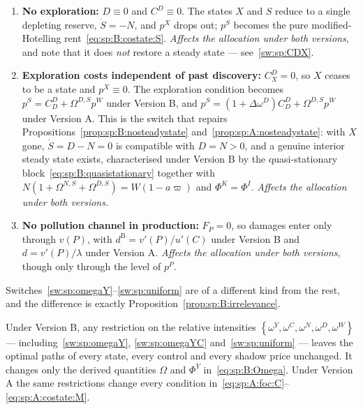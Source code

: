 \begin{enumerate}[label=\textbf{(W\arabic*)},ref=W\arabic*,leftmargin=3.2em,itemsep=0.35em]
\item\label{sw:sp:explore} \textbf{No exploration:} $D\equiv0$ and $C^D\equiv0$. The states $X$ and $S$
reduce to a single depleting reserve, $\dot S=-N$, and $p^X$ drops out; $p^S$ becomes the pure
modified-Hotelling rent~\eqref{eq:sp:B:costate:S}. \emph{Affects the allocation under both versions},
and note that it does \emph{not} restore a steady state --- see~\ref{sw:sp:CDX}.

\item\label{sw:sp:CDX} \textbf{Exploration costs independent of past discovery:} $C^D_X=0$, so $X$
ceases to be a state and $p^X\equiv0$. The exploration condition becomes $p^S=C^D_D+\Omega^{D,S}p^W$
under Version B, and $p^S=\left(1+\Delta\omega^D\right)C^D_D+\Omega^{D,S}p^W$ under Version A. This is
the switch that repairs Propositions~\ref{prop:sp:B:nosteadystate}
and~\ref{prop:sp:A:nosteadystate}: with $X$ gone, $\dot S=D-N=0$ is compatible with $D=N>0$, and a
genuine interior steady state exists, characterised under Version B by the quasi-stationary
block~\eqref{eq:sp:B:quasistationary} together with
$N\left(1+\Omega^{N,S}+\Omega^{D,S}\right)=W\left(1-a\varpi\right)$ and $\Phi^K=\Phi^I$.
\emph{Affects the allocation under both versions.}

\item\label{sw:sp:nopoll} \textbf{No pollution channel in production:} $F_P=0$, so damages enter only
through $v(P)$, with $d^{\mathrm B}=v'(P)/u'(C)$ under Version B and $d=v'(P)/\lambda$ under Version A.
\emph{Affects the allocation under both versions}, though only through the level of $p^P$.

\end{enumerate}

 Switches~\ref{sw:sp:omegaY}--\ref{sw:sp:uniform} are of a different
kind from the rest, and the difference is exactly
Proposition~\ref{prop:sp:B:irrelevance}.

\begin{proposition}
\label{prop:sp:inert}
Under Version B, any restriction on the relative intensities $\left\{\omega^Y,\omega^C,\omega^{N},
\omega^{D},\omega^W\right\}$ --- including~\ref{sw:sp:omegaY}, \ref{sw:sp:omegaYC}
and~\ref{sw:sp:uniform} --- leaves the optimal paths of every state, every control and every shadow
price unchanged. It changes only the derived quantities $\Omega$ and $\Phi^Y$
in~\eqref{eq:sp:B:Omega}. Under Version A the same restrictions change every condition
in~\eqref{eq:sp:A:foc:C}--\eqref{eq:sp:A:costate:M}.
\end{proposition}

